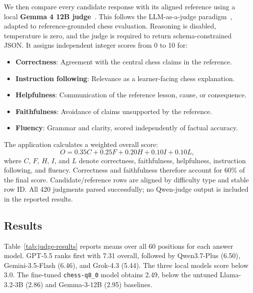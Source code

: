 \documentclass[sigconf,nonacm]{acmart}
\begin{document}
We then compare every candidate response with its aligned reference using a local \textbf{Gemma 4 12B judge}~\cite{gemma4}. This follows the LLM-as-a-judge paradigm~\cite{zheng2023judging}, adapted to reference-grounded chess evaluation. Reasoning is disabled, temperature is zero, and the judge is required to return schema-constrained JSON. It assigns independent integer scores from 0 to 10 for:

\begin{itemize}
    \item \textbf{Correctness}: Agreement with the central chess claims in the reference.
    \item \textbf{Instruction following}: Relevance as a learner-facing chess explanation.
    \item \textbf{Helpfulness}: Communication of the reference lesson, cause, or consequence.
    \item \textbf{Faithfulness}: Avoidance of claims unsupported by the reference.
    \item \textbf{Fluency}: Grammar and clarity, scored independently of factual accuracy.
\end{itemize}

The application calculates a weighted overall score:
\begin{equation}
O=0.35C+0.25F+0.20H+0.10I+0.10L,
\end{equation}
where $C$, $F$, $H$, $I$, and $L$ denote correctness, faithfulness, helpfulness, instruction following, and fluency. Correctness and faithfulness therefore account for 60\% of the final score. Candidate/reference rows are aligned by difficulty type and stable row ID. All 420 judgments parsed successfully; no Qwen-judge output is included in the reported results.

\subsection{Results}

Table~\ref{tab:judge-results} reports means over all 60 positions for each answer model. GPT-5.5 ranks first with 7.31 overall, followed by Qwen3.7-Plus (6.50), Gemini-3.5-Flash (6.46), and Grok-4.3 (5.44). The three local models score below 3.0. The fine-tuned \texttt{chess-q8\_0} model obtains 2.49, below the untuned Llama-3.2-3B (2.86) and Gemma-3-12B (2.95) baselines.
\end{document}
